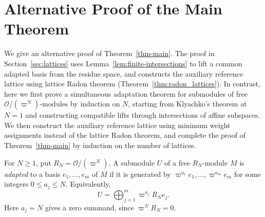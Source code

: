 \documentclass[12pt]{amsart}
\theoremstyle{definition}
\theoremstyle{remark}
\begin{document}
\section{Alternative Proof of the Main Theorem}
\label{sec:alternative}


We give an alternative proof of Theorem~\ref{thm-main}.
The proof in Section~\ref{sec:lattices} uses
Lemma~\ref{lem:finite-intersections} to lift a common adapted
basis from the residue space, and constructs
the auxiliary reference lattice using lattice Radon theorem
(Theorem~\ref{thm:radon_lattices}).
In contrast, here we first prove a simultaneous adaptation theorem for submodules of free $\mathcal O/(\varpi^N)$-modules by induction on $N$, starting from Klyachko's theorem at $N=1$ and constructing compatible lifts through intersections of affine subspaces. We then construct the auxiliary reference lattice using minimum weight assignments instead of the lattice Radon theorem, and complete the proof of Theorem~\ref{thm-main} by induction on the number of lattices.




For $N\geq1$, put $R_N=\mathcal O/(\varpi^N)$. 
A submodule $U$ of a free $R_N$-module $M$ is \emph{adapted} to a basis $e_1,\ldots,e_m$ of $M$ if
it is generated by $\varpi^{a_1}e_1,\ldots,\varpi^{a_m}e_m$ for some integers $0\leq a_j\leq N$.
Equivalently,
\[
  U=\bigoplus_{j=1}^m\varpi^{a_j}R_Ne_j.
\] Here $a_j=N$ gives a zero summand, since $\varpi^NR_N=0$.
\end{document}
